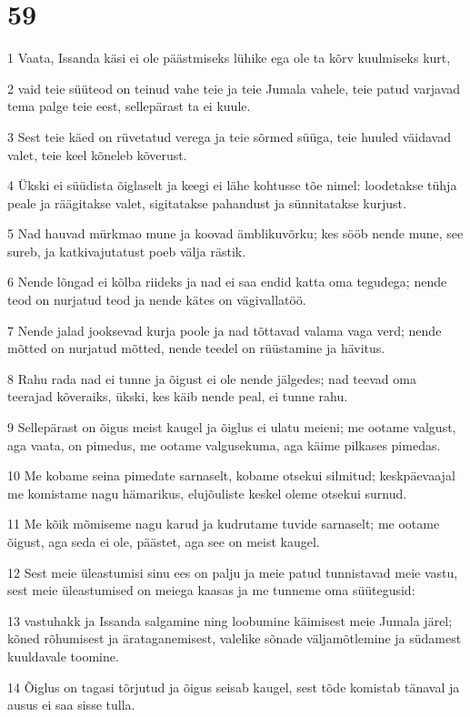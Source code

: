 \chapter{59}

\par 1 Vaata, Issanda käsi ei ole päästmiseks lühike ega ole ta kõrv kuulmiseks kurt,
\par 2 vaid teie süüteod on teinud vahe teie ja teie Jumala vahele, teie patud varjavad tema palge teie eest, sellepärast ta ei kuule.
\par 3 Sest teie käed on rüvetatud verega ja teie sõrmed süüga, teie huuled väidavad valet, teie keel kõneleb kõverust.
\par 4 Ükski ei süüdista õiglaselt ja keegi ei lähe kohtusse tõe nimel: loodetakse tühja peale ja räägitakse valet, sigitatakse pahandust ja sünnitatakse kurjust.
\par 5 Nad hauvad mürkmao mune ja koovad ämblikuvõrku; kes sööb nende mune, see sureb, ja katkivajutatust poeb välja rästik.
\par 6 Nende lõngad ei kõlba riideks ja nad ei saa endid katta oma tegudega; nende teod on nurjatud teod ja nende kätes on vägivallatöö.
\par 7 Nende jalad jooksevad kurja poole ja nad tõttavad valama vaga verd; nende mõtted on nurjatud mõtted, nende teedel on rüüstamine ja hävitus.
\par 8 Rahu rada nad ei tunne ja õigust ei ole nende jälgedes; nad teevad oma teerajad kõveraiks, ükski, kes käib nende peal, ei tunne rahu.
\par 9 Sellepärast on õigus meist kaugel ja õiglus ei ulatu meieni; me ootame valgust, aga vaata, on pimedus, me ootame valgusekuma, aga käime pilkases pimedas.
\par 10 Me kobame seina pimedate sarnaselt, kobame otsekui silmitud; keskpäevaajal me komistame nagu hämarikus, elujõuliste keskel oleme otsekui surnud.
\par 11 Me kõik mõmiseme nagu karud ja kudrutame tuvide sarnaselt; me ootame õigust, aga seda ei ole, päästet, aga see on meist kaugel.
\par 12 Sest meie üleastumisi sinu ees on palju ja meie patud tunnistavad meie vastu, sest meie üleastumised on meiega kaasas ja me tunneme oma süütegusid:
\par 13 vastuhakk ja Issanda salgamine ning loobumine käimisest meie Jumala järel; kõned rõhumisest ja ärataganemisest, valelike sõnade väljamõtlemine ja südamest kuuldavale toomine.
\par 14 Õiglus on tagasi tõrjutud ja õigus seisab kaugel, sest tõde komistab tänaval ja ausus ei saa sisse tulla.
